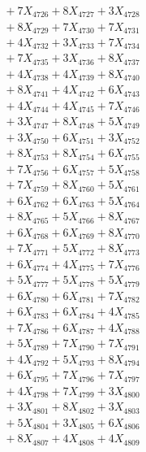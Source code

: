 \documentclass[a4paper,10pt]{article}
\begin{document}
{\begin{align}
&\;  + 7 X_{4726} + 8 X_{4727} + 3 X_{4728} \\[0.3ex]
&\;  + 8 X_{4729} + 7 X_{4730} + 7 X_{4731} \\[0.3ex]
&\;  + 4 X_{4732} + 3 X_{4733} + 7 X_{4734} \\[0.3ex]
&\;  + 7 X_{4735} + 3 X_{4736} + 8 X_{4737} \\[0.3ex]
&\;  + 4 X_{4738} + 4 X_{4739} + 8 X_{4740} \\[0.3ex]
&\;  + 8 X_{4741} + 4 X_{4742} + 6 X_{4743} \\[0.3ex]
&\;  + 4 X_{4744} + 4 X_{4745} + 7 X_{4746} \\[0.3ex]
&\;  + 3 X_{4747} + 8 X_{4748} + 5 X_{4749} \\[0.5ex]\allowbreak
&\;  + 3 X_{4750} + 6 X_{4751} + 3 X_{4752} \\[0.3ex]
&\;  + 8 X_{4753} + 8 X_{4754} + 6 X_{4755} \\[0.3ex]
&\;  + 7 X_{4756} + 6 X_{4757} + 5 X_{4758} \\[0.3ex]
&\;  + 7 X_{4759} + 8 X_{4760} + 5 X_{4761} \\[0.3ex]
&\;  + 6 X_{4762} + 6 X_{4763} + 5 X_{4764} \\[0.3ex]
&\;  + 8 X_{4765} + 5 X_{4766} + 8 X_{4767} \\[0.3ex]
&\;  + 6 X_{4768} + 6 X_{4769} + 8 X_{4770} \\[0.3ex]
&\;  + 7 X_{4771} + 5 X_{4772} + 8 X_{4773} \\[0.3ex]
&\;  + 6 X_{4774} + 4 X_{4775} + 7 X_{4776} \\[0.3ex]
&\;  + 5 X_{4777} + 5 X_{4778} + 5 X_{4779} \\[0.5ex]\allowbreak
&\;  + 6 X_{4780} + 6 X_{4781} + 7 X_{4782} \\[0.3ex]
&\;  + 6 X_{4783} + 6 X_{4784} + 4 X_{4785} \\[0.3ex]
&\;  + 7 X_{4786} + 6 X_{4787} + 4 X_{4788} \\[0.3ex]
&\;  + 5 X_{4789} + 7 X_{4790} + 7 X_{4791} \\[0.3ex]
&\;  + 4 X_{4792} + 5 X_{4793} + 8 X_{4794} \\[0.3ex]
&\;  + 6 X_{4795} + 7 X_{4796} + 7 X_{4797} \\[0.3ex]
&\;  + 4 X_{4798} + 7 X_{4799} + 3 X_{4800} \\[0.3ex]
&\;  + 3 X_{4801} + 8 X_{4802} + 3 X_{4803} \\[0.3ex]
&\;  + 5 X_{4804} + 3 X_{4805} + 6 X_{4806} \\[0.3ex]
&\;  + 8 X_{4807} + 4 X_{4808} + 4 X_{4809} \\[0.5ex]\allowbreak

\end{align}}
\end{document}
